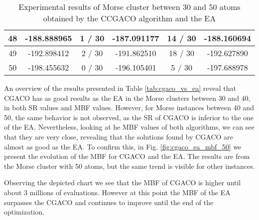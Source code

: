 \begin{table}[!htdp]
\begin{center}
\begin{tabular}{| c | c | c | c | c | c |}
						48 & -188.888965 & 1 / 30 & -187.091177 & 14 / 30 & -188.160694 \\ \hline
						49 & -192.898412 & 2 / 30 & -191.862510 & 18 / 30 & -192.627890 \\ \hline
						50 & -198.455632 & 0 / 30 & -196.105401 & 5 / 30 & -197.688978 \\ \hline
					\end{tabular}
				\end{center}
				\caption{Experimental results of Morse cluster between 30 and 50 atoms obtained by the CCGACO algorithm and the EA}
			\end{table}
			
			An overview of the results presented in Table \ref{tab:cgaco_vs_ea} reveal that CGACO has as good results as the EA in the Morse clusters between 30 and 40, in both SR values and MBF values. However, for Morse instances between 40 and 50, the same behavior is not observed, as the SR of CGACO is inferior to the one of the EA. Nevertheless, looking at he MBF values of both algorithms, we can see that they are very close, revealing that the solutions found by CGACO are almost as good as the EA. To confirm this, in Fig. \ref{fig:cgaco_ea_mbf_50} we present the evolution of the MBF for CGACO and the EA. The results are from the Morse cluster with 50 atoms, but the same trend is visible for other instances. 
			
			Observing the depicted chart we see that the MBF of CGACO is higher until about 3 millions of evaluations. However at this point the MBF of the EA surpasses the CGACO and continues to improve until the end of the optimization.
			
